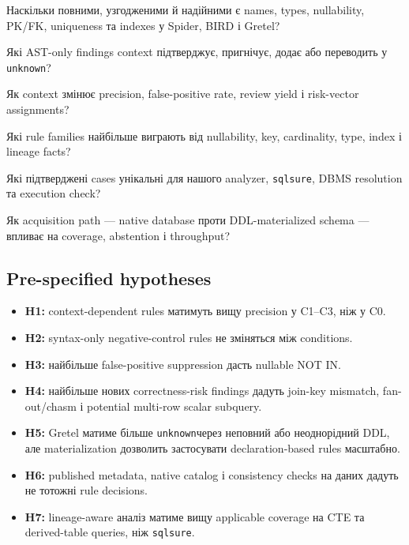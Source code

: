 \documentclass[11pt,a4paper]{article}
\newcommand{\unknown}{\texttt{unknown}}
\begin{document}
\begin{description}[leftmargin=1.5cm,labelwidth=1.0cm,style=nextline]
\item[RQ1] Наскільки повними, узгодженими й надійними є names, types, nullability,
PK/FK, uniqueness та indexes у Spider, BIRD і Gretel?
\item[RQ2] Які AST-only findings context підтверджує, пригнічує, додає або переводить
у \unknown?
\item[RQ3] Як context змінює precision, false-positive rate, review yield і
risk-vector assignments?
\item[RQ4] Які rule families найбільше виграють від nullability, key, cardinality,
type, index і lineage facts?
\item[RQ5] Які підтверджені cases унікальні для нашого analyzer, \texttt{sqlsure},
DBMS resolution та execution check?
\item[RQ6] Як acquisition path --- native database проти DDL-materialized schema ---
впливає на coverage, abstention і throughput?
\end{description}

\subsection{Pre-specified hypotheses}

\begin{itemize}
\item \textbf{H1:} context-dependent rules матимуть вищу precision у C1--C3, ніж у C0.
\item \textbf{H2:} syntax-only negative-control rules не зміняться між conditions.
\item \textbf{H3:} найбільше false-positive suppression дасть nullable NOT IN.
\item \textbf{H4:} найбільше нових correctness-risk findings дадуть join-key mismatch,
      fan-out/chasm і potential multi-row scalar subquery.
\item \textbf{H5:} Gretel матиме більше \unknown через неповний або неоднорідний DDL,
      але materialization дозволить застосувати declaration-based rules масштабно.
\item \textbf{H6:} published metadata, native catalog і consistency checks на даних
      дадуть не тотожні rule decisions.
\item \textbf{H7:} lineage-aware аналіз матиме вищу applicable coverage на CTE та
      derived-table queries, ніж \texttt{sqlsure}.
\end{itemize}
\end{document}
